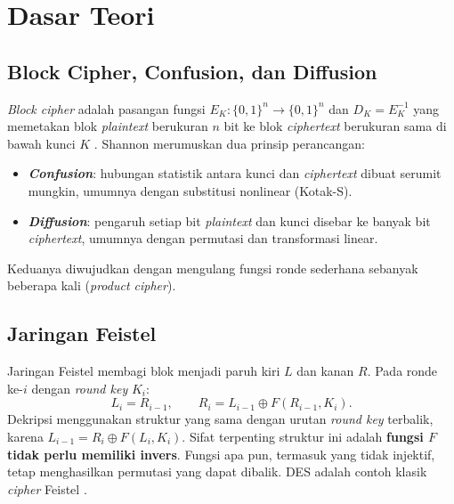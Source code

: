 \chapter{Dasar Teori}
\label{ch:dasar-teori}

\section{Block Cipher, Confusion, dan Diffusion}
\textit{Block cipher} adalah pasangan fungsi $E_K : \{0,1\}^n \to \{0,1\}^n$ dan $D_K = E_K^{-1}$ yang memetakan blok \textit{plaintext} berukuran $n$ bit ke blok \textit{ciphertext} berukuran sama di bawah kunci $K$ \cite{munir2026}. Shannon \cite{shannon1949} merumuskan dua prinsip perancangan:
\begin{itemize}
    \item \textbf{\textit{Confusion}}: hubungan statistik antara kunci dan \textit{ciphertext} dibuat serumit mungkin, umumnya dengan substitusi nonlinear (Kotak-S).
    \item \textbf{\textit{Diffusion}}: pengaruh setiap bit \textit{plaintext} dan kunci disebar ke banyak bit \textit{ciphertext}, umumnya dengan permutasi dan transformasi linear.
\end{itemize}
Keduanya diwujudkan dengan mengulang fungsi ronde sederhana sebanyak beberapa kali (\textit{product cipher}).

\section{Jaringan Feistel}
Jaringan Feistel \cite{feistel1973} membagi blok menjadi paruh kiri $L$ dan kanan $R$. Pada ronde ke-$i$ dengan \textit{round key} $K_i$:
\begin{equation}
    L_i = R_{i-1}, \qquad R_i = L_{i-1} \oplus F(R_{i-1}, K_i).
    \label{eq:feistel}
\end{equation}
Dekripsi menggunakan struktur yang sama dengan urutan \textit{round key} terbalik, karena $L_{i-1} = R_i \oplus F(L_i, K_i)$. Sifat terpenting struktur ini adalah \textbf{fungsi $F$ tidak perlu memiliki invers}. Fungsi apa pun, termasuk yang tidak injektif, tetap menghasilkan permutasi yang dapat dibalik. DES adalah contoh klasik \textit{cipher} Feistel \cite{fips46}.

